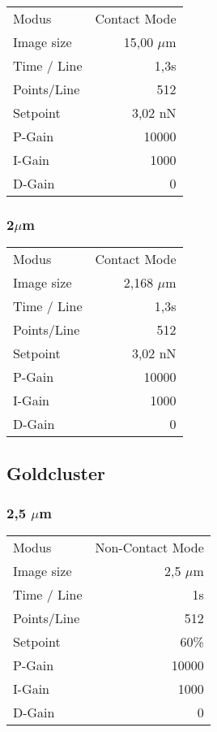 \begin{center}
    \centering
    \begin{tabular}{l|r}
        Modus & Contact Mode\\
        Image size & 15,00 $\mu$m \\
        Time / Line & 1,3s \\
        Points/Line & 512\\
        Setpoint & 3,02 nN \\
        P-Gain & 10000 \\
        I-Gain & 1000 \\
        D-Gain & 0 \\
        
    \end{tabular}
\end{center}

\subsubsection{2$\mu$m}

\begin{center}
    \centering
    \begin{tabular}{l|r}
        Modus & Contact Mode\\
        Image size & 2,168 $\mu$m \\
        Time / Line & 1,3s \\
        Points/Line & 512\\
        Setpoint & 3,02 nN \\
        P-Gain & 10000 \\
        I-Gain & 1000 \\
        D-Gain & 0 \\
        
    \end{tabular}
\end{center}

\subsection{Goldcluster}

\subsubsection{2,5 $\mu$m}
\begin{center}
    \centering
    \begin{tabular}{l|r}
        Modus & Non-Contact Mode\\
        Image size & 2,5 $\mu$m \\
        Time / Line & 1s \\
        Points/Line & 512\\
        Setpoint & 60\% \\
        P-Gain & 10000 \\
        I-Gain & 1000 \\
        D-Gain & 0 \\
        
    \end{tabular}
\end{center}

